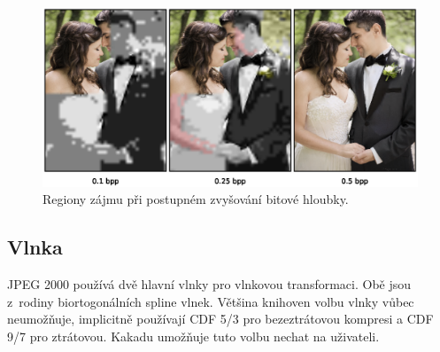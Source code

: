\begin{figure}[hbt!]
  \centering
  \hspace*{-0.75cm}
  \includegraphics[width=16cm]{obrazky-figures/roi/roi.eps}
  \caption{Regiony zájmu při postupném zvyšování bitové hloubky.}
\end{figure}

%
%
\newpage
\subsection*{Vlnka}
JPEG 2000 používá dvě hlavní vlnky pro vlnkovou transformaci. Obě jsou z~rodiny biortogonálních spline vlnek. Většina knihoven volbu vlnky vůbec neumožňuje, implicitně používají CDF 5/3 pro bezeztrátovou kompresi a CDF 9/7 pro ztrátovou. Kakadu umožňuje tuto volbu nechat na uživateli. 

